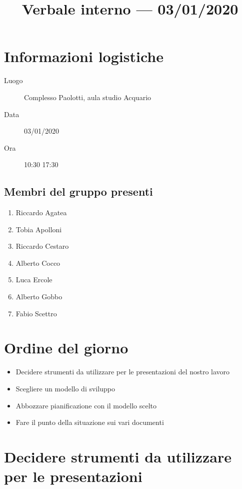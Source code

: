 \documentclass{article}
\title{Verbale interno --- 03/01/2020}
\begin{document}


\section{Informazioni logistiche}%
\label{sec:informazioni_logistiche}

\begin{description}
  \item [Luogo] Complesso Paolotti, aula studio Acquario
  \item [Data] 03/01/2020
  \item [Ora] 10:30  17:30
\end{description}

\subsection{Membri del gruppo presenti}%
\label{sub:membri_del_gruppo_presenti}

\begin{enumerate}
  \item Riccardo Agatea
  \item Tobia Apolloni
  \item Riccardo Cestaro
  \item Alberto Cocco
  \item Luca Ercole
  \item Alberto Gobbo
  \item Fabio Scettro
\end{enumerate}

\section{Ordine del giorno}%
\label{sec:ordine_del_giorno}

\begin{itemize}
  \item Decidere strumenti da utilizzare per le presentazioni del nostro lavoro
  \item Scegliere un modello di sviluppo
  \item Abbozzare pianificazione con il modello scelto
  \item Fare il punto della situazione sui vari documenti
\end{itemize}

\section{Decidere strumenti da utilizzare per le presentazioni}%
\label{sec:decidere_strumenti_da_utilizzare_per_le_presentazioni}
\end{document}
